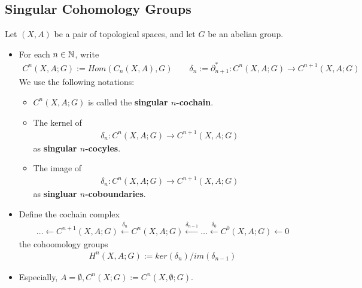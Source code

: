 \documentclass[Total.tex]{subfiles}
\begin{document}
				\subsection{Singular Cohomology Groups}
				\begin{Def}
					Let $(X,A)$ be a pair of topological spaces, and let $G$ be an abelian group.
					\begin{itemize}
						\item For each $n\in \mathbb{N}$, write
						\begin{gather*}
							C^n(X,A;G):=Hom(C_n(X,A),G)\qquad \delta_n:=\partial_{n+1}^*:C^n(X,A;G)\rightarrow C^{n+1}(X,A;G)
						\end{gather*}
						We use the following notations:
						\begin{itemize}
							\item $C^n(X,A;G)$ is called the \textbf{singular $n$-cochain}. 
							\item The kernel of 
							\begin{gather*}
								\delta_n:C^n(X,A;G)\rightarrow C^{n+1}(X,A;G)
							\end{gather*}
							as \textbf{singular $n$-cocyles}.
							\item The image of 
							\begin{gather*}
								\delta_n:C^n(X,A;G)\rightarrow C^{n+1}(X,A;G)
							\end{gather*}
							as \textbf{singluar $n$-coboundaries}.
						\end{itemize}
						\item Define the cochain complex
						\begin{gather*}
							\dots\leftarrow C^{n+1}(X,A;G)\stackrel{\delta_n}{\leftarrow} C^n(X,A;G)\stackrel{\delta_{n-1}}{\leftarrow} \dots\stackrel{\delta_0}{\leftarrow} C^0(X,A;G)\leftarrow 0
						\end{gather*}
						the cohoomology groups
						\begin{gather*}
							H^n(X,A;G):=ker(\delta_n)/im(\delta_{n-1})
						\end{gather*}
						\item Especially, $A=\emptyset,C^n(X;G):=C^n(X,\emptyset;G)$.
					\end{itemize}
				\end{Def}
\end{document}
